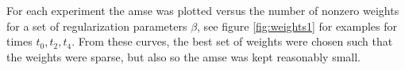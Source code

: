 \documentclass[leqno,onefignum,onetabnum]{siamltexmm}
\begin{document}
For each experiment the amse was plotted versus the number of nonzero weights for a set of regularization parameters $\beta$, see figure \ref{fig:weights1} for examples for times $t_0,t_2,t_4$. From these curves, the best set of weights were chosen such that the weights were sparse, but also so the amse was kept reasonably small. 
\end{document}
